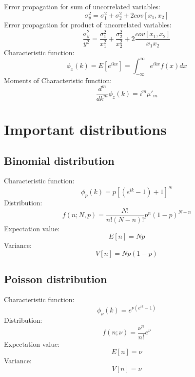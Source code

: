 \documentclass[12pt]{book}
\begin{document}
Error propagation for sum of uncorrelated variables:
\begin{equation}
	\sigma^2_y = \sigma^2_1 + \sigma^2_2 +2cov[x_1,x_2]
\end{equation}
Error propagation for product of uncorrelated variables:
\begin{equation}
	\frac{\sigma^2_y}{y^2} = \frac{\sigma^2_1}{x^2_1} + \frac{\sigma^2_2}{x^2_2} + 2\frac{cov[x_1,x_2]}{x_1x_2}
\end{equation}
Characteristic function:
\begin{equation}
	\phi_x(k) = E[e^{ikx}] = \int_{-\infty}^\infty e^{ikx}f(x)dx
\end{equation}
Moments of Characteristic function:
\begin{equation}
	\frac{d^m}{dk^m}\phi_z(k) = i^m \mu'_m
\end{equation}
\section{Important distributions}
\subsection{Binomial distribution}
Characteristic function:
\begin{equation}
	\phi_p(k)=p\left[\left(e^{ik}-1\right)+1\right]^N
\end{equation}
Distribution:
\begin{equation}
	f(n;N,p) = \frac{N!}{n!(N-n)!}p^n(1-p)^{N-n}
\end{equation}
Expectation value:
\begin{equation}
	E[n] = Np
\end{equation}
Variance:
\begin{equation}
	V[n] = Np(1-p)
\end{equation}
\subsection{Poisson distribution}
Characteristic function:
\begin{equation}
	\phi_\nu(k)=e^{\nu\left(e^{ik}-1\right)}
\end{equation}
Distribution:
\begin{equation}
	f(n;\nu) = \frac{\nu^n}{n!}e^{\nu}
\end{equation}
Expectation value:
\begin{equation}
	E[n] = \nu
\end{equation}
Variance:
\begin{equation}
	V[n] = \nu
\end{equation}
\end{document}
